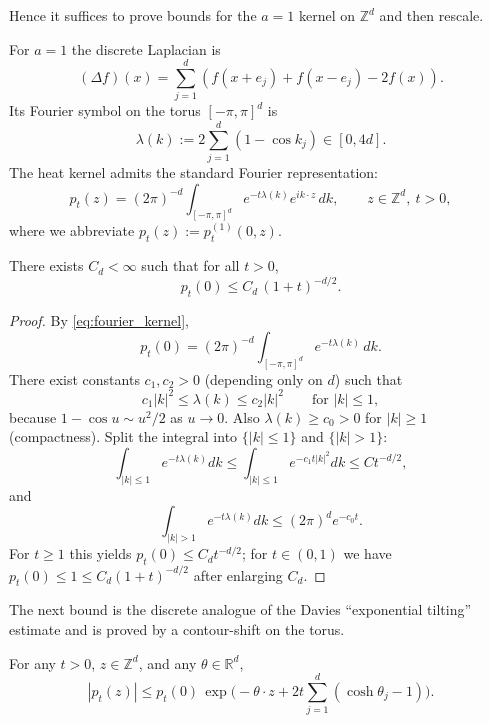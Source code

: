 Hence it suffices to prove bounds for the $a=1$ kernel on $\mathbb Z^d$ and then rescale.

For $a=1$ the discrete Laplacian is
\[
(\Delta f)(x)=\sum_{j=1}^d(f(x+e_j)+f(x-e_j)-2f(x)).
\]
Its Fourier symbol on the torus $[-\pi,\pi]^d$ is
\[
\lambda(k):=2\sum_{j=1}^d(1-\cos k_j)\in[0,4d].
\]
The heat kernel admits the standard Fourier representation:
\begin{equation}\label{eq:fourier_kernel}
p_t(z)=(2\pi)^{-d}\int_{[-\pi,\pi]^d} e^{-t\lambda(k)}e^{i k\cdot z}\,dk,
\qquad z\in\mathbb Z^d,\ t>0,
\end{equation}
where we abbreviate $p_t(z):=p_t^{(1)}(0,z)$.

\begin{lemma}\label{lem:on_diag}
There exists $C_d<\infty$ such that for all $t>0$,
\[
p_t(0)\le C_d\,(1+t)^{-d/2}.
\]
\end{lemma}

\begin{proof}
By \eqref{eq:fourier_kernel},
\[
p_t(0)=(2\pi)^{-d}\int_{[-\pi,\pi]^d} e^{-t\lambda(k)}\,dk.
\]
There exist constants $c_1,c_2>0$ (depending only on $d$) such that
\begin{equation}\label{eq:lambda_quad}
c_1|k|^2\le \lambda(k)\le c_2|k|^2\qquad\text{for }|k|\le 1,
\end{equation}
because $1-\cos u\sim u^2/2$ as $u\to0$.
Also $\lambda(k)\ge c_0>0$ for $|k|\ge 1$ (compactness).
Split the integral into $\{|k|\le 1\}$ and $\{|k|>1\}$:
\[
\int_{|k|\le 1} e^{-t\lambda(k)}dk\le \int_{|k|\le 1} e^{-c_1 t|k|^2}dk \le C t^{-d/2},
\]
and
\[
\int_{|k|>1} e^{-t\lambda(k)}dk \le (2\pi)^d e^{-c_0 t}.
\]
For $t\ge 1$ this yields $p_t(0)\le C_d t^{-d/2}$; for $t\in(0,1)$ we have $p_t(0)\le 1\le C_d(1+t)^{-d/2}$ after enlarging $C_d$.
\end{proof}

The next bound is the discrete analogue of the Davies ``exponential tilting'' estimate and is proved by a contour-shift on the torus.

\begin{lemma}\label{lem:tilt}
For any $t>0$, $z\in\mathbb Z^d$, and any $\theta\in\mathbb R^d$,
\begin{equation}\label{eq:tilt_bound}
|p_t(z)|
\le
p_t(0)\,
\exp\!\Big(-\theta\cdot z + 2t\sum_{j=1}^d(\cosh \theta_j-1)\Big).
\end{equation}
\end{lemma}

